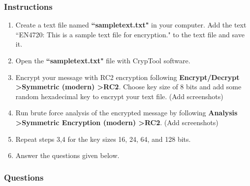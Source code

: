 \documentclass[11pt,letterpaper]{article}
\begin{document}
	\subsubsection*{Instructions}
	\begin{enumerate}
		\item Create a text file named \textbf{``sampletext.txt"} in your computer. Add the text ``EN4720: This is a sample text file for encryption." to the text file and save it.
		\item Open the \textbf{``sampletext.txt"} file with CrypTool software.
		\item Encrypt your message with RC2 encryption following \textbf{Encrypt/Decrypt \textgreater Symmetric (modern) \textgreater RC2}. Choose key size of 8 bits and add some random hexadecimal key to encrypt your text file. (Add screenshots)
		\item Run brute force analysis of the encrypted message by following \textbf{Analysis \textgreater Symmetric Encryption (modern) \textgreater RC2}. (Add screenshots)
		\item Repeat steps 3,4 for the key sizes 16, 24, 64, and 128 bits.
		\item Answer the questions given below.
	\end{enumerate}
	\pagebreak
	\subsubsection*{Questions}
	
\end{document}
